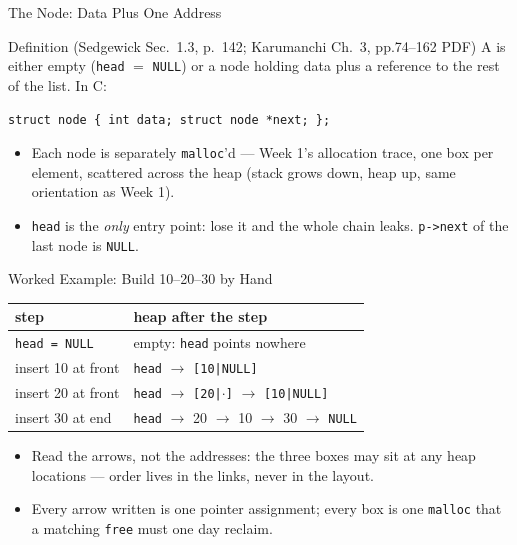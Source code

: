 \documentclass[aspectratio=169]{beamer}
\begin{document}
\begin{frame}{The Node: Data Plus One Address}
  \begin{block}{Definition (Sedgewick Sec.~1.3, p.~142; Karumanchi Ch.~3,
    pp.74--162 PDF)
    \cite{Sedgewick2011_algorithms,Karumanchi2017_data_structures_algorithms_made_easy}}
    A  is either empty (\texttt{head} $=$ \texttt{NULL}) or
    a node holding data plus a reference to the rest of the list. In C:
  \end{block}
\begin{center}
{\small \texttt{struct node \{ int data; struct node *next; \};}}
\end{center}
  \begin{itemize}
    \item Each node is separately \texttt{malloc}'d --- Week 1's allocation
      trace, one box per element, scattered across the heap (stack grows
      down, heap up, same orientation as Week 1).
    \item \texttt{head} is the \emph{only} entry point: lose it and the whole
      chain leaks. \texttt{p->next} of the last node is \texttt{NULL}.
  \end{itemize}
\end{frame}

\begin{frame}{Worked Example: Build 10--20--30 by Hand}
  \begin{center}
  {\small
  \begin{tabular}{ll}
    \toprule
    \textbf{step} & \textbf{heap after the step} \\
    \midrule
    \texttt{head = NULL} & empty: \texttt{head} points nowhere \\
    insert 10 at front & \texttt{head} $\to$ \texttt{[10|NULL]} \\
    insert 20 at front & \texttt{head} $\to$ \texttt{[20|$\cdot$]} $\to$
      \texttt{[10|NULL]} \\
    insert 30 at end & \texttt{head} $\to$ 20 $\to$ 10 $\to$ 30 $\to$
      \texttt{NULL} \\
    \bottomrule
  \end{tabular}}
  \end{center}
  \begin{itemize}
    \item Read the arrows, not the addresses: the three boxes may sit at any
      heap locations --- order lives in the links, never in the layout.
    \item Every arrow written is one pointer assignment; every box is one
      \texttt{malloc} that a matching \texttt{free} must one day reclaim.
  \end{itemize}
\end{frame}
\end{document}
